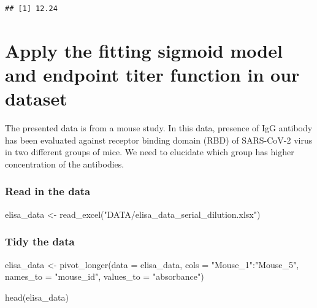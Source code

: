 \documentclass[
]{book}
\newenvironment{Shaded}{\begin{snugshade}}{\end{snugshade}}
\newcommand{\AttributeTok}[1]{\textcolor[rgb]{0.77,0.63,0.00}{#1}}
\newcommand{\FunctionTok}[1]{\textcolor[rgb]{0.00,0.00,0.00}{#1}}
\newcommand{\NormalTok}[1]{#1}
\newcommand{\OtherTok}[1]{\textcolor[rgb]{0.56,0.35,0.01}{#1}}
\newcommand{\SpecialCharTok}[1]{\textcolor[rgb]{0.00,0.00,0.00}{#1}}
\newcommand{\StringTok}[1]{\textcolor[rgb]{0.31,0.60,0.02}{#1}}
\begin{document}
\begin{verbatim}
## [1] 12.24
\end{verbatim}

\hypertarget{apply-the-fitting-sigmoid-model-and-endpoint-titer-function-in-our-dataset}{%
\section{Apply the fitting sigmoid model and endpoint titer function in our dataset}\label{apply-the-fitting-sigmoid-model-and-endpoint-titer-function-in-our-dataset}}

The presented data is from a mouse study. In this data, presence of IgG antibody has been evaluated against receptor binding domain (RBD) of SARS-CoV-2 virus in two different groups of mice. We need to elucidate which group has higher concentration of the antibodies.

\hypertarget{read-in-the-data-1}{%
\subsubsection{Read in the data}\label{read-in-the-data-1}}

\begin{Shaded}
\begin{Highlighting}[]
\NormalTok{elisa\_data }\OtherTok{\textless{}{-}} \FunctionTok{read\_excel}\NormalTok{(}\StringTok{"DATA/elisa\_data\_serial\_dilution.xlsx"}\NormalTok{)}
\end{Highlighting}
\end{Shaded}

\hypertarget{tidy-the-data}{%
\subsubsection{Tidy the data}\label{tidy-the-data}}

\begin{Shaded}
\begin{Highlighting}[]
\NormalTok{elisa\_data }\OtherTok{\textless{}{-}} \FunctionTok{pivot\_longer}\NormalTok{(}\AttributeTok{data =}\NormalTok{ elisa\_data, }
                           \AttributeTok{cols =} \StringTok{"Mouse\_1"}\SpecialCharTok{:}\StringTok{"Mouse\_5"}\NormalTok{, }
                           \AttributeTok{names\_to =} \StringTok{"mouse\_id"}\NormalTok{, }
                           \AttributeTok{values\_to =} \StringTok{"absorbance"}\NormalTok{)}

\FunctionTok{head}\NormalTok{(elisa\_data)}
\end{Highlighting}
\end{Shaded}
\end{document}
